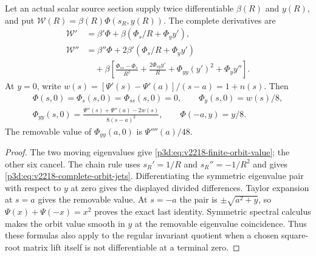 \documentclass[12pt,a4paper]{article}
\begin{document}
\begin{proposition}
\label{p3d:prop:v2218-finite-orbit-contacts}
Let an actual scalar source section supply twice differentiable
$\beta(R)$ and $y(R)$, and put
$\mathscr W(R)=\beta(R)\Phi(s_R,y(R))$.  The complete derivatives are
\begin{align}
 \mathscr W'&=\beta'\Phi+
       \beta(\Phi_s/R+\Phi_y y'),\nonumber\\
 \mathscr W''&=\beta''\Phi+
 2\beta'(\Phi_s/R+\Phi_y y')\nonumber\\
 &\quad+\beta\left[
 \frac{\Phi_{ss}-\Phi_s}{R^2}
 +\frac{2\Phi_{sy}y'}R+\Phi_{yy}(y')^2+\Phi_y y''\right].
 \label{p3d:eq:v2218-complete-orbit-jets}
\end{align}
At $y=0$, write
$w(s)=[\Psi'(s)-\Psi'(a)]/(s-a)=1+n(s)$.  Then
\begin{gather}
 \Phi(s,0)=\Phi_s(s,0)=\Phi_{ss}(s,0)=0,
 \qquad \Phi_y(s,0)=w(s)/8,\nonumber\\
 \Phi_{yy}(s,0)=
 \frac{\Psi''(s)+\Psi''(a)-2w(s)}{8(s-a)^2},
 \qquad
 \boxed{\Phi(-a,y)=y/8.}
 \label{p3d:eq:v2218-orbit-zero-jets}
\end{gather}
The removable value of $\Phi_{yy}(a,0)$ is $\Psi''''(a)/48$.
\end{proposition}
\begin{proof}
The two moving eigenvalues give
\eqref{p3d:eq:v2218-finite-orbit-value}; the other six cancel.
The chain rule uses $s_R'=1/R$ and $s_R''=-1/R^2$ and gives
\eqref{p3d:eq:v2218-complete-orbit-jets}.  Differentiating the symmetric
eigenvalue pair with respect to $y$ at zero gives the displayed divided
differences.  Taylor expansion at $s=a$ gives the removable value.
At $s=-a$ the pair is
$\pm\sqrt{a^2+y}$, so
$\Psi(x)+\Psi(-x)=x^2$ proves the exact last identity.
Symmetric spectral calculus makes the orbit value smooth in $y$ at the
removable eigenvalue coincidence.  Thus these formulas also apply to
the regular invariant quotient when a chosen square-root matrix lift
itself is not differentiable at a terminal zero.
\end{proof}
\end{document}
